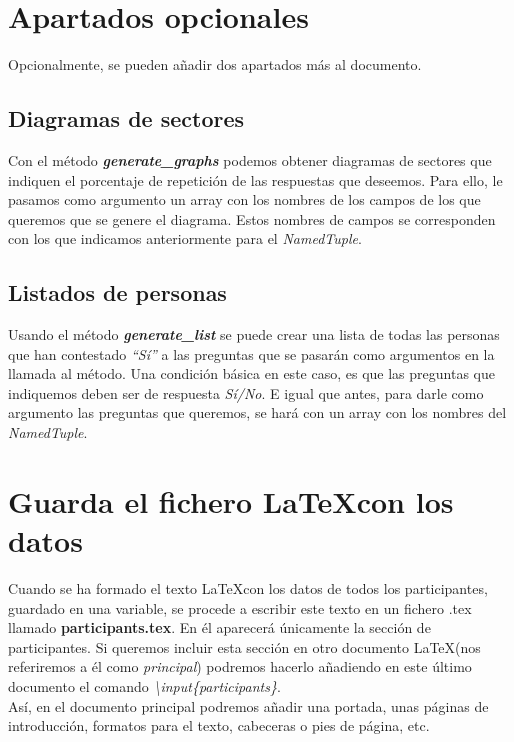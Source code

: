 \documentclass[a4paper, 12pt]{book}
\begin{document}
\section{Apartados opcionales}
\label{sec:opcional}
Opcionalmente, se pueden añadir dos apartados más al documento.

\subsection{Diagramas de sectores}
\label{subsec:diagramas}
Con el método \textbf{\textit{generate\_graphs}} podemos obtener diagramas de sectores que indiquen el porcentaje de repetición de las respuestas que deseemos. Para ello, le pasamos como argumento un array con los nombres de los campos de los que queremos que se genere el diagrama. Estos nombres de campos se corresponden con los que indicamos anteriormente para el \textit{NamedTuple}.

\subsection{Listados de personas}
\label{subsec:listados}
Usando el método \textbf{\textit{generate\_list}} se puede crear una lista de todas las personas que han contestado \textit{``Sí''} a las preguntas que se pasarán como argumentos en la llamada al método. Una condición básica en este caso, es que las preguntas que indiquemos deben ser de respuesta \textit{Sí/No}. E igual que antes, para darle como argumento las preguntas que queremos, se hará con un array con los nombres del \textit{NamedTuple}.


\section{Guarda el fichero \LaTeX con los datos}
\label{sec:guardaLatex}
Cuando se ha formado el texto \LaTeX con los datos de todos los participantes, guardado en una variable, se procede a escribir este texto en un fichero .tex llamado \textbf{participants.tex}. En él aparecerá únicamente la sección de participantes. Si queremos incluir esta sección en otro documento \LaTeX (nos referiremos a él como \textit{principal}) podremos hacerlo añadiendo en este último documento el comando \mbox{\textit{\textbackslash input\{participants\}}}.\\

Así, en el documento principal podremos añadir una portada, unas páginas de introducción, formatos para el texto, cabeceras o pies de página, etc.\\
\end{document}
